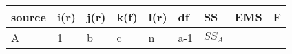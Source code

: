 \documentclass[12pt,]{article}
\begin{document}
\begin{longtable}[]{@{}lllllllll@{}}
\toprule
\begin{minipage}[b]{0.06\columnwidth}\raggedright
source\strut
\end{minipage} & \begin{minipage}[b]{0.03\columnwidth}\raggedright
i(r)\strut
\end{minipage} & \begin{minipage}[b]{0.03\columnwidth}\raggedright
j(r)\strut
\end{minipage} & \begin{minipage}[b]{0.03\columnwidth}\raggedright
k(f)\strut
\end{minipage} & \begin{minipage}[b]{0.03\columnwidth}\raggedright
l(r)\strut
\end{minipage} & \begin{minipage}[b]{0.12\columnwidth}\raggedright
df\strut
\end{minipage} & \begin{minipage}[b]{0.15\columnwidth}\raggedright
SS\strut
\end{minipage} & \begin{minipage}[b]{0.21\columnwidth}\raggedright
EMS\strut
\end{minipage} & \begin{minipage}[b]{0.09\columnwidth}\raggedright
F\strut
\end{minipage}\tabularnewline
\midrule
\endhead
\begin{minipage}[t]{0.06\columnwidth}\raggedright
A\strut
\end{minipage} & \begin{minipage}[t]{0.03\columnwidth}\raggedright
1\strut
\end{minipage} & \begin{minipage}[t]{0.03\columnwidth}\raggedright
b\strut
\end{minipage} & \begin{minipage}[t]{0.03\columnwidth}\raggedright
c\strut
\end{minipage} & \begin{minipage}[t]{0.03\columnwidth}\raggedright
n\strut
\end{minipage} & \begin{minipage}[t]{0.12\columnwidth}\raggedright
a-1\strut
\end{minipage} & \begin{minipage}[t]{0.15\columnwidth}\raggedright
\(SS_A\)\strut
\end{minipage} & \begin{minipage}[t]{0.21\columnwidth}\raggedright

\end{minipage}
\end{longtable}
\end{document}
